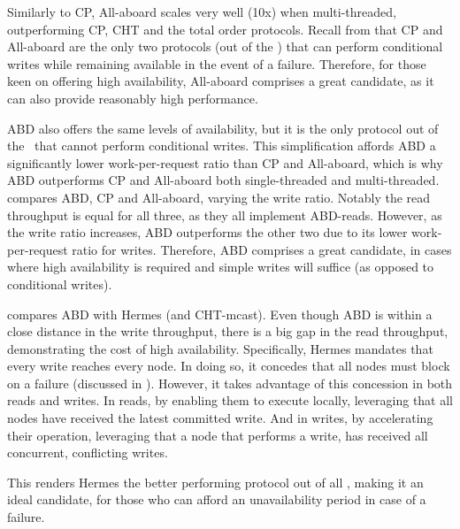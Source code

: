 Similarly to CP, All-aboard scales very well (10x) when multi-threaded, outperforming CP, CHT and the total order protocols.
Recall from  that CP and All-aboard are the only two protocols (out of the \pnum) that can perform conditional writes while remaining available in the event of a failure. Therefore, for those keen on offering high availability, All-aboard comprises a great candidate, as it can also provide reasonably high performance.


ABD also offers the same levels of availability, but it is the only protocol out of the \pnum~that cannot perform conditional writes.
This simplification affords ABD a significantly lower work-per-request ratio than CP and All-aboard, which is why ABD outperforms CP and All-aboard both single-threaded and multi-threaded.
 compares ABD, CP and All-aboard, varying the write ratio. Notably the read throughput is equal for all three, as they all implement ABD-reads. However, as the write ratio increases, ABD outperforms the other two due to its lower work-per-request ratio for writes.
Therefore, ABD comprises a great candidate, in cases where high availability is required and simple writes will suffice (as opposed to conditional writes).

 compares ABD with Hermes (and CHT-mcast). Even though ABD is within a close distance in the write throughput, there is a big gap in the read throughput, demonstrating the cost of high availability. Specifically, Hermes mandates that every write reaches every node. In doing so, it concedes that all nodes must block on a failure (discussed in ). However, it takes advantage of this concession in both reads and writes. In reads, by enabling them to execute locally, leveraging that all nodes have received the latest committed write. And in writes, by accelerating their operation, leveraging that a node that performs a write, has received all concurrent, conflicting writes.

This renders Hermes the better performing protocol out of all \pnum, making it an ideal candidate, for those who can afford an unavailability period in case of a failure.




